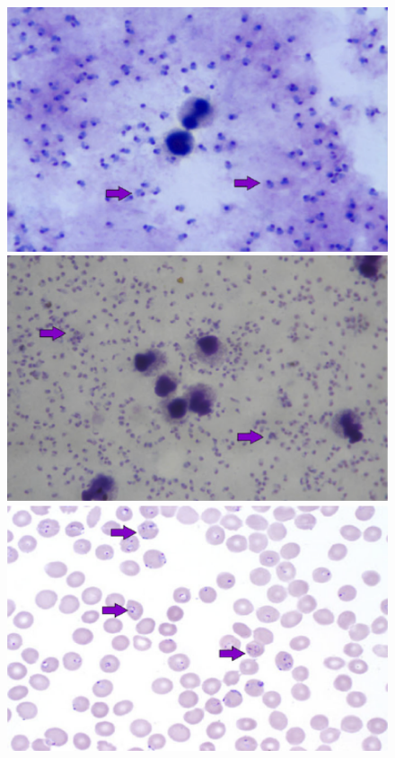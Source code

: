 \documentclass[sensors,review,submit,moreauthors,pdftex,10pt,a4paper]{mdpi}
\begin{document}
	\begin{figure}[!t]
		\centering
		\includegraphics[height=0.15\textheight]{img/f3_ThickGiemsa}
		\includegraphics[height=0.15\textheight]{img/f3_ThickLeishman}
		\includegraphics[height=0.15\textheight]{img/f3_ThinGiemsa}

\end{figure}
\end{document}
